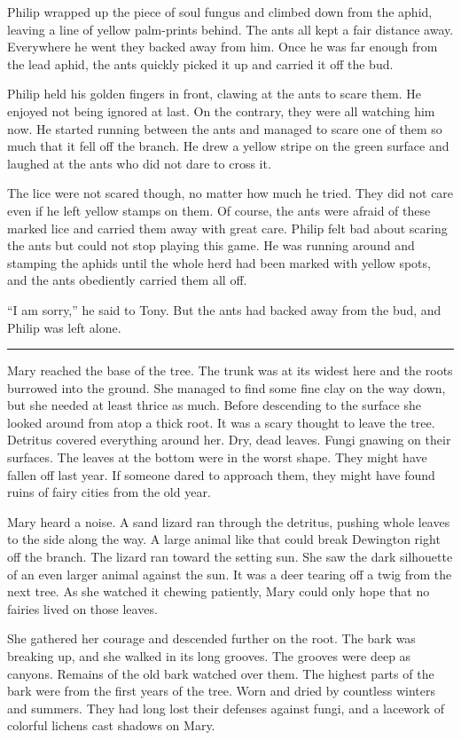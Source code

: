 \documentclass[10pt]{memoir}
\renewcommand{\pfbreakdisplay}{\bigskip \ding{166} \bigskip}
\newcommand{\secbreak}{\fancybreak{\pfbreakdisplay}}
\begin{document}
Philip wrapped up the piece of soul fungus and climbed down from the aphid,
leaving a line of yellow palm-prints behind. The ants all kept a fair distance
away. Everywhere he went they backed away from him. Once he was far enough from
the lead aphid, the ants quickly picked it up and carried it off the bud.

Philip held his golden fingers in front, clawing at the ants to scare them.
He enjoyed not being ignored at last. On the contrary, they were all watching
him now. He started running between the ants and managed to scare one of them
so much that it fell off the branch. He drew a yellow stripe on the green
surface and laughed at the ants who did not dare to cross it.

The lice were not scared though, no matter how much he tried. They did not
care even if he left yellow stamps on them. Of course, the ants were afraid of
these marked lice and carried them away with great care. Philip felt bad about
scaring the ants but could not stop playing this game. He was running around
and stamping the aphids until the whole herd had been marked with yellow spots,
and the ants obediently carried them all off.

``I am sorry,'' he said to Tony. But the ants had backed away from the bud, and
Philip was left alone.

\secbreak

Mary reached the base of the tree. The trunk was at its widest here and the
roots burrowed into the ground. She managed to find some fine clay on the way
down, but she needed at least thrice as much. Before descending to the surface
she looked around from atop a thick root. It was a scary thought to leave the
tree. Detritus covered everything around her. Dry, dead leaves. Fungi gnawing
on their surfaces. The leaves at the bottom were in the worst shape. They might
have fallen off last year. If someone dared to approach them, they might have
found ruins of fairy cities from the old year.

Mary heard a noise. A sand lizard ran through the detritus, pushing whole
leaves to the side along the way. A large animal like that could break
Dewington right off the branch. The lizard ran toward the setting sun. She saw
the dark silhouette of an even larger animal against the sun. It was a deer
tearing off a twig from the next tree. As she watched it chewing patiently,
Mary could only hope that no fairies lived on those leaves.

She gathered her courage and descended further on the root. The bark was
breaking up, and she walked in its long grooves. The grooves were deep as
canyons. Remains of the old bark watched over them. The highest parts of the
bark were from the first years of the tree. Worn and dried by countless winters
and summers. They had long lost their defenses against fungi, and a lacework of
colorful lichens cast shadows on Mary.
\end{document}
